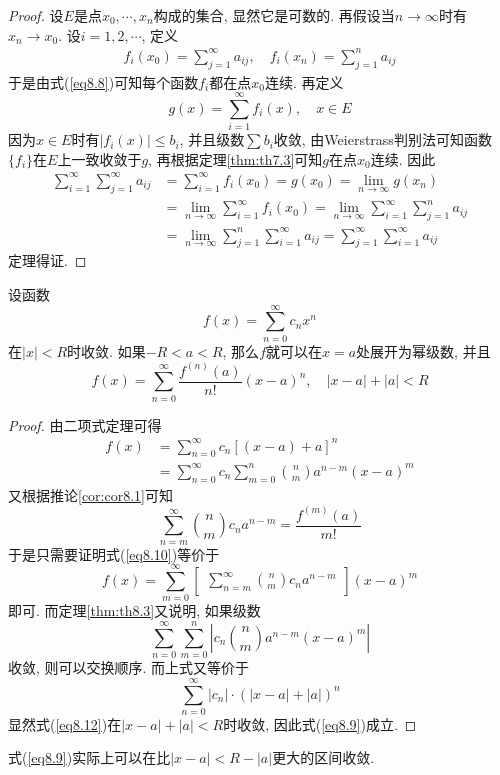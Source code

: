 \documentclass[cn,12pt,math=mtpro2,citestyle=gb7714-2015,bibstyle=gb7714-2015,twocol]{elegantbook}
\newcommand{\limn}{\lim_{n\to\infty}}
\begin{document}
\begin{proof}
  设$E$是点$x_0,\cdots,x_n$构成的集合, 显然它是可数的. 再假设当$n\to\infty$时有$x_n\to x_0$. 设$i=1,2,\cdots$, 定义
  \begin{align*}
  f_i(x_0)=\sum_{j=1}^{\infty}a_{ij},\quad f_i(x_n)=\sum_{j=1}^{n}a_{ij}
  \end{align*}
  于是由式(\ref{eq8.8})可知每个函数$f_i$都在点$x_0$连续. 再定义
  $$g(x)=\sum_{i=1}^{\infty}f_i(x),\quad x\in E$$
  因为$x\in E$时有$|f_i(x)|\leq b_i$, 并且级数$\sum b_i$收敛, 由Weierstrass判别法可知函数$\{f_i\}$在$E$上一致收敛于$g$, 再根据定理\ref{thm:th7.3}可知$g$在点$x_0$连续. 因此
  \begin{align*}
  \sum_{i=1}^{\infty}\sum_{j=1}^{\infty}a_{ij}&=\sum_{i=1}^{\infty}f_i(x_0)=g(x_0)=\limn g(x_n) \\
  &=\limn \sum_{i=1}^{\infty}f_i(x_0)=\limn \sum_{i=1}^{\infty}\sum_{j=1}^{n}a_{ij} \\
  &=\limn \sum_{j=1}^{n}\sum_{i=1}^{\infty}a_{ij}=\sum_{j=1}^{\infty}\sum_{i=1}^{\infty}a_{ij}
  \end{align*}
  定理得证.

\end{proof}
\begin{theorem}\label{thm:th8.4}
  设函数
  $$f(x)=\sum_{n=0}^{\infty}c_nx^n$$
  在$|x|<R$时收敛. 如果$-R<a<R$, 那么$f$就可以在$x=a$处展开为幂级数, 并且
  \begin{equation}\label{eq8.9}
    f(x)=\sum_{n=0}^{\infty}\frac{f^{(n)}(a)}{n!}(x-a)^n, \quad |x-a|+|a|<R
  \end{equation}
\end{theorem}
\begin{proof}
  由二项式定理可得
  \begin{align}\label{eq8.10}
  f(x)&=\sum_{n=0}^{\infty}c_n[(x-a)+a]^n \nonumber \\
  &=\sum_{n=0}^{\infty}c_n\sum_{m=0}^{n}\binom{n}{m}a^{n-m}(x-a)^m
  \end{align}
  又根据推论\ref{cor:cor8.1}可知
  $$\sum_{n=m}^{\infty}\binom{n}{m}c_na^{n-m}=\frac{f^{(m)}(a)}{m!}$$
  于是只需要证明式(\ref{eq8.10})等价于
  $$f(x)=\sum_{m=0}^{\infty}\begin{bmatrix}
                              \displaystyle \sum_{n=m}^{\infty}\binom{n}{m}c_na^{n-m}
                            \end{bmatrix}(x-a)^m$$
  即可. 而定理\ref{thm:th8.3}又说明, 如果级数
  \begin{equation}\label{eq8.11}
    \sum_{n=0}^{\infty}\sum_{m=0}^{n}\left|c_n\binom{n}{m}a^{n-m}(x-a)^m\right|
  \end{equation}
  收敛, 则可以交换顺序. 而上式又等价于
  \begin{equation}\label{eq8.12}
    \sum_{n=0}^{\infty}|c_n|\cdot(|x-a|+|a|)^n
  \end{equation}
  显然式(\ref{eq8.12})在$|x-a|+|a|<R$时收敛, 因此式(\ref{eq8.9})成立.

\end{proof}
\begin{remark}
式(\ref{eq8.9})实际上可以在比$|x-a|<R-|a|$更大的区间收敛.
\end{remark}
\end{document}
